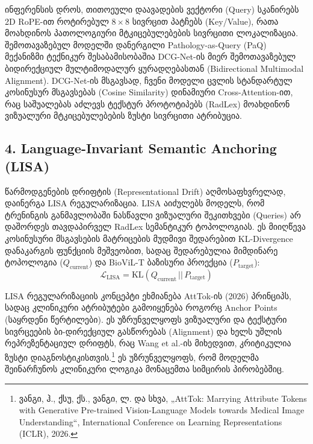 \documentclass[12pt,a4paper,oneside]{report}
\begin{document}
ინფერენსის დროს, თითოეული დაავადების ვექტორი (Query) სკანირებს 2D RoPE-ით როტირებულ $8 \times 8$ სივრცით პატჩებს (Key/Value), რათა მოახდინოს პათოლოგიური მტკიცებულებების სივრცითი ლოკალიზაცია. შემოთავაზებულ მოდელში დანერგილი Pathology-as-Query (PaQ) მექანიზმი ტექნიკურ შესაბამისობაშია DCG-Net-ის მიერ შემოთავაზებულ ბიდირექციულ მულტიმოდალურ ყურადღებასთან (Bidirectional Multimodal Alignment). DCG-Net-ის მსგავსად, ჩვენი მოდელი ცვლის სტანდარტულ კოსინუსურ მსგავსებას (Cosine Similarity) დინამიური Cross-Attention-ით, რაც საშუალებას აძლევს ტექსტურ პროტოტიპებს (RadLex) მოახდინონ ვიზუალური მტკიცებულებების ზუსტი სივრცითი ატრიბუცია.

\subsection{4. Language-Invariant Semantic Anchoring (LISA)}
წარმოდგენების დრიფტის (Representational Drift) აღმოსაფხვრელად, დაინერგა LISA რეგულარიზაცია. LISA აიძულებს მოდელს, რომ ტრენინგის განმავლობაში ნასწავლი ვიზუალური შეკითხვები (Queries) არ დაშორდეს თავდაპირველ RadLex სემანტიკურ ტოპოლოგიას. ეს მიიღწევა კოსინუსური მსგავსების მატრიცების მუდმივი შედარებით KL-Divergence დანაკარგის ფუნქციის მეშვეობით, სადაც შედარებულია მიმდინარე ტოპოლოგია ($Q_{\text{current}}$) და BioViL-T ბაზისური პროექცია ($P_{\text{target}}$):
\begin{equation}
\mathcal{L}_{\text{LISA}} = \text{KL}(Q_{\text{current}} \,||\, P_{\text{target}})
\end{equation}

LISA რეგულარიზაციის კონცეპტი ეხმიანება AttTok-ის (2026) პრინციპს, სადაც კლინიკური ატრიბუტები გამოიყენება როგორც Anchor Points (საყრდენი წერტილები). ეს უზრუნველყოფს ვიზუალური და ტექსტური სივრცეების ბი-დირექციულ გასწორებას (Alignment) და ხელს უშლის რეპრეზენტაციულ დრიფტს, რაც Wang et al.-ის მიხედვით, კრიტიკულია ზუსტი დიაგნოსტიკისთვის.\footnote{ვანგი, ჰ., ქსუ, ქს., ვანგი, ლ. და სხვა, „AttTok: Marrying Attribute Tokens with Generative Pre-trained Vision-Language Models towards Medical Image Understanding“, International Conference on Learning Representations (ICLR), 2026.} ეს უზრუნველყოფს, რომ მოდელმა შეინარჩუნოს კლინიკური ლოგიკა მონაცემთა სიმცირის პირობებშიც.
\end{document}
